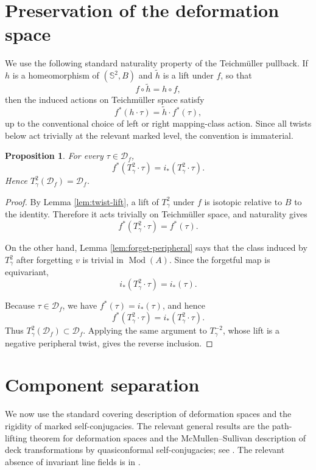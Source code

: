 \documentclass[11pt]{article}
\newcommand{\Sph}{\mathbb S^2}
\newcommand{\D}{\mathcal D}
\newcommand{\Mod}{\operatorname{Mod}}
\newtheorem{proposition}[theorem]{Proposition}
\theoremstyle{remark}
\begin{document}
\section{Preservation of the deformation space}

We use the following standard naturality property of the Teichm\"uller
pullback.  If \(h\) is a homeomorphism of \((\Sph,B)\) and
\(\widetilde h\) is a lift under \(f\), so that
\[
f\circ\widetilde h=h\circ f,
\]
then the induced actions on Teichm\"uller space satisfy
\[
f^*(h\cdot\tau)=\widetilde h\cdot f^*(\tau),
\]
up to the conventional choice of left or right mapping-class action.
Since all twists below act trivially at the relevant marked level,
the convention is immaterial.

\begin{proposition}\label{prop:preservation}
For every \(\tau\in\D_f\),
\[
f^*(T_\gamma^2\cdot\tau)
=i_*(T_\gamma^2\cdot\tau).
\]
Hence \(T_\gamma^2(\D_f)=\D_f\).
\end{proposition}

\begin{proof}
By Lemma \ref{lem:twist-lift}, a lift of \(T_\gamma^2\) under \(f\)
is isotopic relative to \(B\) to the identity.  Therefore it acts
trivially on Teichm\"uller space, and naturality gives
\[
f^*(T_\gamma^2\cdot\tau)=f^*(\tau).
\]

On the other hand, Lemma \ref{lem:forget-peripheral} says that the
class induced by \(T_\gamma^2\) after forgetting \(v\) is trivial in
\(\Mod(A)\).  Since the forgetful map is equivariant,
\[
i_*(T_\gamma^2\cdot\tau)=i_*(\tau).
\]

Because \(\tau\in\D_f\), we have \(f^*(\tau)=i_*(\tau)\), and hence
\[
f^*(T_\gamma^2\cdot\tau)=i_*(T_\gamma^2\cdot\tau).
\]
Thus \(T_\gamma^2(\D_f)\subset\D_f\).  Applying the same argument
to \(T_\gamma^{-2}\), whose lift is a negative peripheral twist,
gives the reverse inclusion.
\end{proof}

\section{Component separation}

We now use the standard covering description of deformation spaces
and the rigidity of marked self-conjugacies.  The relevant general
results are the path-lifting theorem for deformation spaces and the
McMullen--Sullivan description of deck transformations by
quasiconformal self-conjugacies; see
\cite{McMullenSullivan}.  The relevant absence of invariant line
fields is in \cite[Chapter 3]{McMullenBook}.
\end{document}
